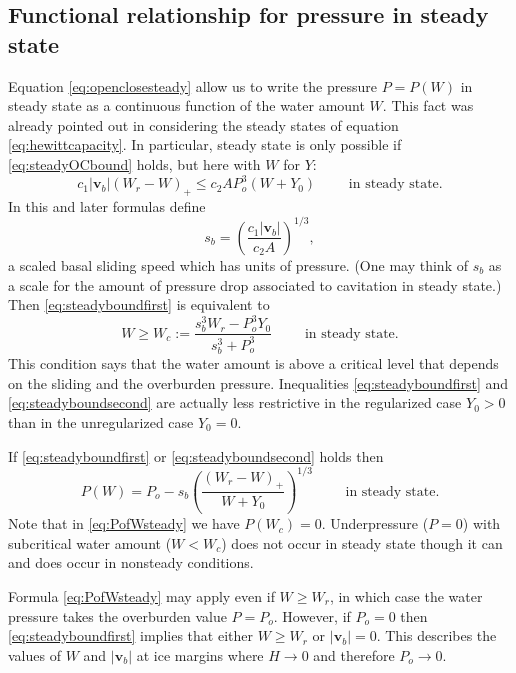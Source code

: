 \documentclass[11pt,final]{amsart}%
\newcommand\bv{\mathbf{v}}
\begin{document}
\subsection*{Functional relationship for pressure in steady state}  Equation \eqref{eq:openclosesteady} allow us to write the pressure $P=P(W)$ in steady state as a continuous function of the water amount $W$.  This fact was already pointed out in considering the steady states of equation \eqref{eq:hewittcapacity}.  In particular, steady state is only possible if \eqref{eq:steadyOCbound} holds, but here with $W$ for $Y$:
\begin{equation}
c_1 |\bv_b| (W_r - W)_+ \le c_2 A P_o^3 (W+Y_0) \qquad \text{ in steady state}. \label{eq:steadyboundfirst}
\end{equation}
In this and later formulas define
\begin{equation}
s_b =  \left(\frac{c_1 |\bv_b|}{c_2 A}\right)^{1/3},  \label{eq:definesb}
\end{equation}
a scaled basal sliding speed which has units of pressure.  (One may think of $s_b$ as a scale for the amount of pressure drop associated to cavitation in steady state.)  Then \eqref{eq:steadyboundfirst} is equivalent to
\begin{equation}
W \ge W_c := \frac{s_b^3 W_r - P_o^3 Y_0}{s_b^3 + P_o^3} \qquad \text{ in steady state}. \label{eq:steadyboundsecond}
\end{equation}
This condition says that the water amount is above a critical level that depends on the sliding and the overburden pressure.  Inequalities \eqref{eq:steadyboundfirst} and \eqref{eq:steadyboundsecond} are actually less restrictive in the regularized case $Y_0>0$ than in the unregularized case $Y_0=0$.

If \eqref{eq:steadyboundfirst} or \eqref{eq:steadyboundsecond} holds then
\begin{equation}
P(W) = P_o - s_b \left(\frac{(W_r - W)_+}{W+Y_0}\right)^{1/3} \qquad \text{ in steady state}.  \label{eq:PofWsteady}
\end{equation}
Note that in \eqref{eq:PofWsteady} we have $P(W_c)=0$.  Underpressure ($P=0$) with subcritical water amount ($W<W_c$) does not occur in steady state though it can and does occur in nonsteady conditions.  

Formula \eqref{eq:PofWsteady} may apply even if $W\ge W_r$, in which case the water pressure takes the overburden value $P = P_o$.  However, if $P_o=0$ then \eqref{eq:steadyboundfirst} implies that either $W\ge W_r$ or $|\bv_b|=0$.  This describes the values of $W$ and $|\bv_b|$ at ice margins where $H\to 0$ and therefore $P_o\to 0$.
\end{document}
